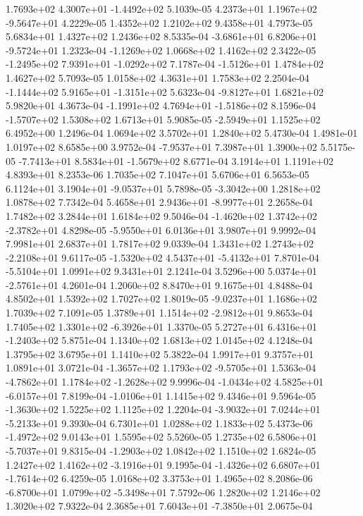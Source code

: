  1.7693e+02  4.3007e+01 -1.4492e+02  5.1039e-05
 4.2373e+01  1.1967e+02 -9.5647e+01  4.2229e-05
1.4352e+02 1.2102e+02 9.4358e+01  4.7973e-05
5.6834e+01 1.4327e+02 1.2436e+02  8.5335e-04
-3.6861e+01  6.8206e+01 -9.5724e+01  1.2323e-04
-1.1269e+02  1.0668e+02  1.4162e+02  2.3422e-05
-1.2495e+02  7.9391e+01 -1.0292e+02  7.1787e-04
-1.5126e+01  1.4784e+02  1.4627e+02  5.7093e-05
1.0158e+02 4.3631e+01 1.7583e+02  2.2504e-04
-1.1444e+02  5.9165e+01 -1.3151e+02  5.6323e-04
-9.8127e+01  1.6821e+02  5.9820e+01  4.3673e-04
-1.1991e+02  4.7694e+01 -1.5186e+02  8.1596e-04
-1.5707e+02  1.5308e+02  1.6713e+01  5.9085e-05
-2.5949e+01  1.1525e+02  6.4952e+00  1.2496e-04
1.0694e+02 3.5702e+01 1.2840e+02  5.4730e-04
1.4981e-01 1.0197e+02 8.6585e+00  3.9752e-04
-7.9537e+01  7.3987e+01  1.3900e+02  5.5175e-05
-7.7413e+01  8.5834e+01 -1.5679e+02  8.6771e-04
3.1914e+01 1.1191e+02 4.8393e+01  8.2353e-06
1.7035e+02 7.1047e+01 5.6706e+01  6.5653e-05
 6.1124e+01  3.1904e+01 -9.0537e+01  5.7898e-05
-3.3042e+00  1.2818e+02  1.0878e+02  7.7342e-04
 5.4658e+01  2.9436e+01 -8.9977e+01  2.2658e-04
1.7482e+02 3.2844e+01 1.6184e+02  9.5046e-04
-1.4620e+02  1.3742e+02 -2.3782e+01  4.8298e-05
-5.9550e+01  6.0136e+01  3.9807e+01  9.9992e-04
7.9981e+01 2.6837e+01 1.7817e+02  9.0339e-04
 1.3431e+02  1.2743e+02 -2.2108e+01  9.6117e-05
-1.5320e+02  4.5437e+01 -5.4132e+01  7.8701e-04
-5.5104e+01  1.0991e+02  9.3431e+01  2.1241e-04
 3.5296e+00  5.0374e+01 -2.5761e+01  4.2601e-04
1.2060e+02 8.8470e+01 9.1675e+01  4.8488e-04
4.8502e+01 1.5392e+02 1.7027e+02  1.8019e-05
-9.0237e+01  1.1686e+02  1.7039e+02  7.1091e-05
 1.3789e+01  1.1514e+02 -2.9812e+01  9.8653e-04
 1.7405e+02  1.3301e+02 -6.3926e+01  1.3370e-05
 5.2727e+01  6.4316e+01 -1.2403e+02  5.8751e-04
1.1340e+02 1.6813e+02 1.0145e+02  4.1248e-04
1.3795e+02 3.6795e+01 1.1410e+02  5.3822e-04
1.9917e+01 9.3757e+01 1.0891e+01  3.0721e-04
-1.3657e+02  1.1793e+02 -9.5705e+01  1.5363e-04
-4.7862e+01  1.1784e+02 -1.2628e+02  9.9996e-04
-1.0434e+02  4.5825e+01 -6.0157e+01  7.8199e-04
-1.0106e+01  1.1415e+02  9.4346e+01  9.5964e-05
-1.3630e+02  1.5225e+02  1.1125e+02  1.2204e-04
-3.9032e+01  7.0244e+01 -5.2133e+01  9.3930e-04
6.7301e+01 1.0288e+02 1.1833e+02  5.4373e-06
-1.4972e+02  9.0143e+01  1.5595e+02  5.5260e-05
 1.2735e+02  6.5806e+01 -5.7037e+01  9.8315e-04
-1.2903e+02  1.0842e+02  1.1510e+02  1.6824e-05
 1.2427e+02  1.4162e+02 -3.1916e+01  9.1995e-04
-1.4326e+02  6.6807e+01 -1.7614e+02  6.4259e-05
1.0168e+02 3.3753e+01 1.4965e+02  8.2086e-06
-6.8700e+01  1.0799e+02 -5.3498e+01  7.5792e-06
1.2820e+02 1.2146e+02 1.3020e+02  7.9322e-04
 2.3685e+01  7.6043e+01 -7.3850e+01  2.0675e-04
